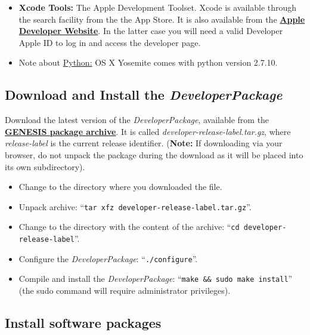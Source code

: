 \documentclass[12pt]{article}
\begin{document}
\begin{itemize}
\item[]{\bf Xcode Tools:} The Apple Development Toolset. Xcode is available through the search facility from the the App Store. It is also available from the \href{http://developer.apple.com/technology/xcode.html}{\bf Apple Developer Website}. In the latter case  you will need a valid Developer Apple ID to log in and access the developer page.
   
\item[]Note about \href{http://python.org/}{Python:} OS X Yosemite comes with python version 2.7.10.
\end{itemize}
   

\subsection*{Download and Install the {\it DeveloperPackage}}

Download the latest version of the {\it DeveloperPackage}, available from the \href{http://repo-genesis3.cbi.utsa.edu/src/}{\bf GENESIS package archive}.  It is called {\it developer-release-label.tar.gz}, where {\it release-label} is the current release identifier. ({\bf Note:} If downloading via your browser, do not unpack the package during the download as it will be placed into its own subdirectory).
\begin{itemize}
   \item[] Change to the directory where you downloaded the file.
   \item[] Unpack archive: ``{\tt tar xfz developer-release-label.tar.gz}''.
   \item[] Change to the directory with the content of the archive: ``{\tt cd developer-release-label}''.
   \item[] Configure the {\it DeveloperPackage}: ``{\tt ./configure}''.
   \item[] Compile and install the {\it DeveloperPackage}: ``{\tt make \&\& sudo make install}'' (the sudo command will require administrator privileges).
\end{itemize}


\subsection*{Install software packages}
\end{document}

